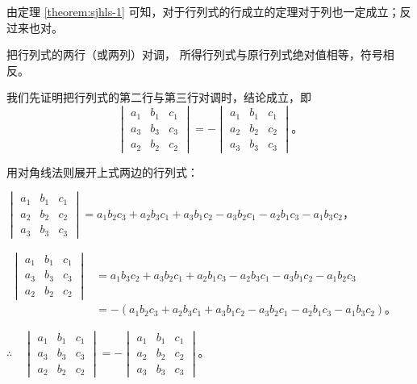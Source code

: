 由定理 \ref{theorem:sjhls-1} 可知，对于行列式的行成立的定理对于列也一定成立；反过来也对。


\begin{theorem} \label{theorem:sjhls-2}
    把行列式的两行（或两列）对调， 所得行列式与原行列式绝对值相等，符号相反。
\end{theorem}

\zhengming 我们先证明把行列式的第二行与第三行对调时，结论成立，即
$$
\begin{vmatrix*}
    a_1 & b_1 & c_1 \\
    a_3 & b_3 & c_3 \\
    a_2 & b_2 & c_2
\end{vmatrix*}
=
- \begin{vmatrix*}
    a_1 & b_1 & c_1 \\
    a_2 & b_2 & c_2 \\
    a_3 & b_3 & c_3
\end{vmatrix*} \text{。}
$$

用对角线法则展开上式两边的行列式：

$\begin{vmatrix*}
    a_1 & b_1 & c_1 \\
    a_2 & b_2 & c_2 \\
    a_3 & b_3 & c_3
\end{vmatrix*} = a_1b_2c_3 + a_2b_3c_1 + a_3b_1c_2 - a_3b_2c_1 - a_2b_1c_3 - a_1b_3c_2$，

$\begin{aligned}
\begin{vmatrix*}
    a_1 & b_1 & c_1 \\
    a_3 & b_3 & c_3 \\
    a_2 & b_2 & c_2
\end{vmatrix*}
    &= a_1b_3c_2 + a_3b_2c_1 + a_2b_1c_3 - a_2b_3c_1 - a_3b_1c_2 - a_1b_2c_3 \\
    &= -(a_1b_2c_3 + a_2b_3c_1 + a_3b_1c_2 - a_3b_2c_1 - a_2b_1c_3 - a_1b_3c_2) \text{。}
\end{aligned}$

$\therefore \quad
\begin{vmatrix*}
    a_1 & b_1 & c_1 \\
    a_3 & b_3 & c_3 \\
    a_2 & b_2 & c_2
\end{vmatrix*}
=
- \begin{vmatrix*}
    a_1 & b_1 & c_1 \\
    a_2 & b_2 & c_2 \\
    a_3 & b_3 & c_3
\end{vmatrix*} \text{。}
$

